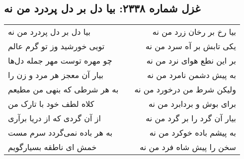 \begin{center}
\section*{غزل شماره ۲۳۳۸: بیا دل بر دل پردرد من نه}
\label{sec:2338}
\begin{longtable}{l p{0.5cm} r}
بیا دل بر دل پردرد من نه
&&
بیا رخ بر رخان زرد من نه
\\
تویی خورشید وز تو گرم عالم
&&
یکی تابش بر آه سرد من نه
\\
چو مهره توست مهر جمله دل‌ها
&&
بر این نطع هوای نرد من نه
\\
بیار آن معجز هر مرد و زن را
&&
به پیش دشمن نامرد من نه
\\
به هر شرطی که بنهی من مطیعم
&&
ولیکن شرط من درخورد من نه
\\
کلاه لطف خود با تارک من
&&
برای بوش و بردابرد من نه
\\
از آن گردی که از دریا برآری
&&
بیار آن گرد را بر گرد من نه
\\
به هر باده نمی‌گردد سرم مست
&&
به پیشم باده خوکرد من نه
\\
خمش ای ناطقه بسیارگویم
&&
سخن را پیش شاه فرد من نه
\\
\end{longtable}
\end{center}
